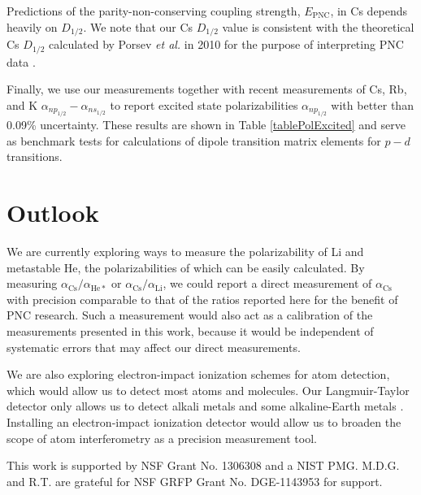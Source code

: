 \documentclass[twocolumn,pra,showpacs,superscriptaddress,longbibliography]{revtex4-1}   %
\newcommand{\acs}{\alpha_{\textrm{Cs}}}
\newcommand{\etalspace}{\textit{et al. }}
\begin{document}
Predictions of the parity-non-conserving coupling strength, $E_{\mathrm{PNC}}$, in Cs depends heavily on $D_{1/2}$.
We note that our Cs $D_{1/2}$ value is consistent with the theoretical Cs $D_{1/2}$ calculated by Porsev \etalspace in 2010 for the purpose of interpreting PNC data \cite{Porsev2010}.


Finally, we use our measurements together with recent measurements of Cs, Rb, and K $\alpha_{np_{1/2}} - \alpha_{ns_{1/2}}$ \cite{Hunter1991,Miller1994} to report excited state polarizabilities $\alpha_{np_{1/2}}$ with better than 0.09\% uncertainty. 
These results are shown in Table \ref{tablePolExcited} and serve as benchmark tests for calculations of dipole transition matrix elements for $p-d$ transitions.

\section{Outlook} \label{sectionOutlook}

We are currently exploring ways to measure the polarizability of Li and metastable He, the polarizabilities of which can be easily calculated. By measuring $\acs/\alpha_{\mathrm{He*}}$ or $\acs/\alpha_{\mathrm{Li}}$, we could report a direct measurement of $\acs$ with precision comparable to that of the ratios reported here for the benefit of PNC research. Such a measurement would also act as a calibration of the measurements presented in this work, because it would be independent of systematic errors that may affect our direct measurements.

We are also exploring electron-impact ionization schemes for atom detection, which would allow us to detect most atoms and molecules. Our Langmuir-Taylor detector only allows us to detect alkali metals and some alkaline-Earth metals \cite{Delhuille2002}. Installing an electron-impact ionization detector would allow us to broaden the scope of atom interferometry as a precision measurement tool. 

This work is supported by NSF Grant No. 1306308 and a NIST PMG. M.D.G. and R.T. are grateful for NSF GRFP Grant No. DGE-1143953 for support. 

%
%

\end{document}
